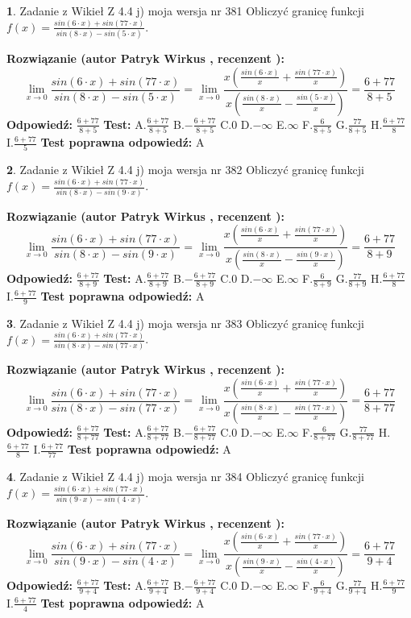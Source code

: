 \documentclass[12pt, a4paper]{article}
\theoremstyle{definition} %
\newtheorem{zad}{}
\newcommand{\zadStart}[1]{\begin{zad}#1\newline}
\newcommand{\zadStop}{\end{zad}}
\newcommand{\rozwStart}[2]{\noindent \textbf{Rozwiązanie (autor #1 , recenzent #2): }\newline}
\newcommand{\rozwStop}{\newline}
\newcommand{\odpStart}{\noindent \textbf{Odpowiedź:}\newline}
\newcommand{\odpStop}{\newline}
\newcommand{\testStart}{\noindent \textbf{Test:}\newline}
\newcommand{\testStop}{\newline}
\newcommand{\kluczStart}{\noindent \textbf{Test poprawna odpowiedź:}\newline}
\newcommand{\kluczStop}{\newline}
\begin{document}
\zadStart{Zadanie z Wikieł Z 4.4 j) moja wersja nr 381}
Obliczyć granicę funkcji $f(x)=\frac{sin(6\cdot x) +sin(77\cdot x)}{sin(8\cdot x) -sin(5\cdot x)}$.
\zadStop
\rozwStart{Patryk Wirkus}{}
$$\lim\limits_{x\to 0}\frac{sin(6\cdot x) +sin(77\cdot x)}{sin(8\cdot x) -sin(5\cdot x)}=\lim\limits_{x\to 0}\frac{x(\frac{sin(6\cdot x)}{x}+\frac{sin(77\cdot x)}{x})}{x(\frac{sin(8\cdot x)}{x}-\frac{sin(5\cdot x)}{x})}=\frac{6+77}{8+5}$$
\rozwStop
\odpStart
$\frac{6+77}{8+5}$
\odpStop
\testStart
A.$\frac{6+77}{8+5}$
B.$-\frac{6+77}{8+5}$
C.$0$
D.$-\infty$
E.$\infty$
F.$\frac{6}{8+5}$
G.$\frac{77}{8+5}$
H.$\frac{6+77}{8}$
I.$\frac{6+77}{5}$
\testStop
\kluczStart
A
\kluczStop



\zadStart{Zadanie z Wikieł Z 4.4 j) moja wersja nr 382}
Obliczyć granicę funkcji $f(x)=\frac{sin(6\cdot x) +sin(77\cdot x)}{sin(8\cdot x) -sin(9\cdot x)}$.
\zadStop
\rozwStart{Patryk Wirkus}{}
$$\lim\limits_{x\to 0}\frac{sin(6\cdot x) +sin(77\cdot x)}{sin(8\cdot x) -sin(9\cdot x)}=\lim\limits_{x\to 0}\frac{x(\frac{sin(6\cdot x)}{x}+\frac{sin(77\cdot x)}{x})}{x(\frac{sin(8\cdot x)}{x}-\frac{sin(9\cdot x)}{x})}=\frac{6+77}{8+9}$$
\rozwStop
\odpStart
$\frac{6+77}{8+9}$
\odpStop
\testStart
A.$\frac{6+77}{8+9}$
B.$-\frac{6+77}{8+9}$
C.$0$
D.$-\infty$
E.$\infty$
F.$\frac{6}{8+9}$
G.$\frac{77}{8+9}$
H.$\frac{6+77}{8}$
I.$\frac{6+77}{9}$
\testStop
\kluczStart
A
\kluczStop



\zadStart{Zadanie z Wikieł Z 4.4 j) moja wersja nr 383}
Obliczyć granicę funkcji $f(x)=\frac{sin(6\cdot x) +sin(77\cdot x)}{sin(8\cdot x) -sin(77\cdot x)}$.
\zadStop
\rozwStart{Patryk Wirkus}{}
$$\lim\limits_{x\to 0}\frac{sin(6\cdot x) +sin(77\cdot x)}{sin(8\cdot x) -sin(77\cdot x)}=\lim\limits_{x\to 0}\frac{x(\frac{sin(6\cdot x)}{x}+\frac{sin(77\cdot x)}{x})}{x(\frac{sin(8\cdot x)}{x}-\frac{sin(77\cdot x)}{x})}=\frac{6+77}{8+77}$$
\rozwStop
\odpStart
$\frac{6+77}{8+77}$
\odpStop
\testStart
A.$\frac{6+77}{8+77}$
B.$-\frac{6+77}{8+77}$
C.$0$
D.$-\infty$
E.$\infty$
F.$\frac{6}{8+77}$
G.$\frac{77}{8+77}$
H.$\frac{6+77}{8}$
I.$\frac{6+77}{77}$
\testStop
\kluczStart
A
\kluczStop



\zadStart{Zadanie z Wikieł Z 4.4 j) moja wersja nr 384}
Obliczyć granicę funkcji $f(x)=\frac{sin(6\cdot x) +sin(77\cdot x)}{sin(9\cdot x) -sin(4\cdot x)}$.
\zadStop
\rozwStart{Patryk Wirkus}{}
$$\lim\limits_{x\to 0}\frac{sin(6\cdot x) +sin(77\cdot x)}{sin(9\cdot x) -sin(4\cdot x)}=\lim\limits_{x\to 0}\frac{x(\frac{sin(6\cdot x)}{x}+\frac{sin(77\cdot x)}{x})}{x(\frac{sin(9\cdot x)}{x}-\frac{sin(4\cdot x)}{x})}=\frac{6+77}{9+4}$$
\rozwStop
\odpStart
$\frac{6+77}{9+4}$
\odpStop
\testStart
A.$\frac{6+77}{9+4}$
B.$-\frac{6+77}{9+4}$
C.$0$
D.$-\infty$
E.$\infty$
F.$\frac{6}{9+4}$
G.$\frac{77}{9+4}$
H.$\frac{6+77}{9}$
I.$\frac{6+77}{4}$
\testStop
\kluczStart
A
\kluczStop
\end{document}
